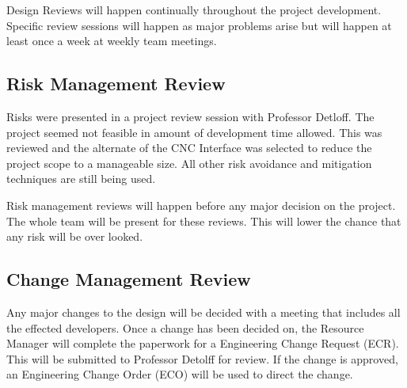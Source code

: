 Design Reviews will happen continually throughout the project development. 
Specific review sessions will happen as major problems arise but will happen at least once a week at weekly team meetings.
\subsection{Risk Management Review}
Risks were presented in a project review session with Professor Detloff.
The project seemed not feasible in amount of development time allowed.
This was reviewed and the alternate of the CNC Interface was selected to reduce the project scope to a manageable size. 
All other risk avoidance and mitigation techniques are still being used.   

Risk management reviews will happen before any major decision on the project.
The whole team will be present for these reviews. 
This will lower the chance that any risk will be over looked.
\subsection{Change Management Review}
Any major changes to the design will be decided with a meeting that includes all the effected developers.
Once a change has been decided on, the Resource Manager will complete the paperwork for a Engineering Change Request (ECR).
This will be submitted to Professor Detolff for review.
If the change is approved, an Engineering Change Order (ECO) will be used to direct the change.

